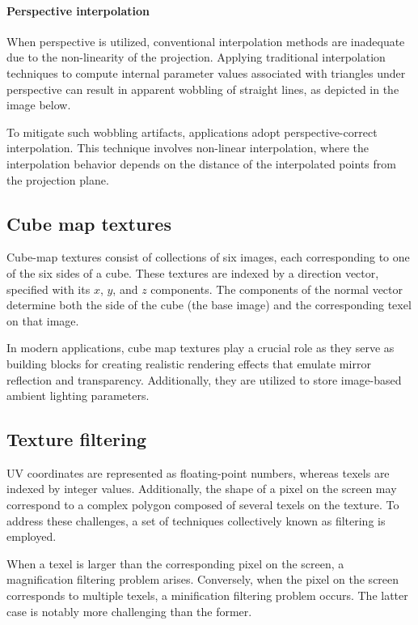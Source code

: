 \paragraph*{Perspective interpolation}
When perspective is utilized, conventional interpolation methods are inadequate due to the non-linearity of the projection. 
Applying traditional interpolation techniques to compute internal parameter values associated with triangles under perspective can result in apparent wobbling of straight lines, as depicted in the image below.

To mitigate such wobbling artifacts, applications adopt perspective-correct interpolation. 
This technique involves non-linear interpolation, where the interpolation behavior depends on the distance of the interpolated points from the projection plane.

\subsection{Cube map textures}
Cube-map textures consist of collections of six images, each corresponding to one of the six sides of a cube. 
These textures are indexed by a direction vector, specified with its $x$, $y$, and $z$ components. 
The components of the normal vector determine both the side of the cube (the base image) and the corresponding texel on that image.

In modern applications, cube map textures play a crucial role as they serve as building blocks for creating realistic rendering effects that emulate mirror reflection and transparency. 
Additionally, they are utilized to store image-based ambient lighting parameters.

\subsection{Texture filtering}
UV coordinates are represented as floating-point numbers, whereas texels are indexed by integer values. 
Additionally, the shape of a pixel on the screen may correspond to a complex polygon composed of several texels on the texture. 
To address these challenges, a set of techniques collectively known as filtering is employed.

When a texel is larger than the corresponding pixel on the screen, a magnification filtering problem arises. 
Conversely, when the pixel on the screen corresponds to multiple texels, a minification filtering problem occurs. 
The latter case is notably more challenging than the former.

